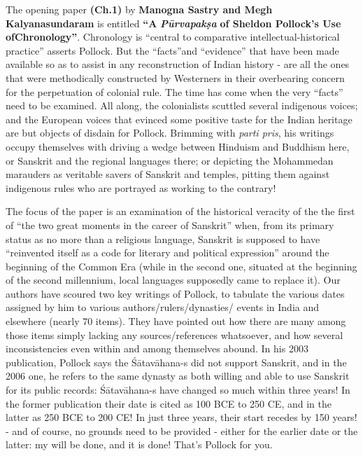 The opening paper \textbf{(Ch.1)} by \textbf{Manogna Sastry and Megh Kalyanasundaram} is entitled \textbf{“A} \textit{\textbf{Pūrvapakṣa}}\textbf{ of Sheldon Pollock's Use of\break Chronology”}. Chronology is “central to comparative intellectual-\break historical practice” asserts Pollock. But the “facts”and “evidence” that have been made available so as to assist in any reconstruction of Indian history - are all the ones that were methodically constructed by Westerners in their overbearing concern for the perpetuation of colonial rule. The time has come when the very “facts” need to be examined. All along, the colonialists scuttled several indigenous voices; and the European voices that evinced some positive taste for the Indian heritage are but objects of disdain for Pollock. Brimming with\textit{ parti pris}, his writings occupy themselves with driving a wedge between Hinduism and Buddhism here, or Sanskrit and the regional languages there; or depicting the Mohammedan marauders as veritable savers of Sanskrit and temples, pitting them against indigenous rules who are portrayed as working to the contrary!

The focus of the paper is an examination of the historical veracity of the the first of “the two great moments in the career of Sanskrit” when, from its primary status as no more than a religious language, Sanskrit is supposed to have “reinvented itself as a code for literary and political expression” around the beginning of the Common Era (while in the second one, situated at the beginning of the second millennium, local languages supposedly came to replace it). Our authors have scoured two key writings of Pollock, to tabulate the various dates assigned by him to various authors/rulers/dynasties/ events in India and elsewhere (nearly 70 items). They have pointed out how there are many among those items simply lacking any sources/references whatsoever, and how several inconsistencies even within and among themselves abound. In his 2003 publication, Pollock says the Śātavāhana-s did not support Sanskrit, and in the 2006 one, he refers to the same dynasty as both willing and able to use Sanskrit for its public records: Śātavāhana-s have changed so much within three years! In the former publication their date is cited as 100 BCE to 250 CE, and in the latter as 250 BCE to 200 CE! In just three years, their start recedes by 150 years! - and of course, no grounds need to be provided - either for the earlier date or the latter: my will be done, and it is done! That’s Pollock for you.

